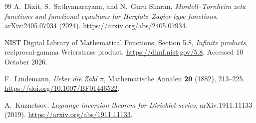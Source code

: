 \begin{thebibliography}{99}
A.~Dixit, S.~Sathyanarayana, and N.~Guru Sharan,
\emph{Mordell--Tornheim zeta functions and functional equations for
Herglotz--Zagier type functions}, arXiv:2405.07934 (2024).
\url{https://arxiv.org/abs/2405.07934}.

NIST Digital Library of Mathematical Functions, Section 5.8,
\emph{Infinite products}, reciprocal-gamma Weierstrass product.
\url{https://dlmf.nist.gov/5.8}. Accessed 10 October 2026.

F.~Lindemann, \emph{Ueber die Zahl $\pi$},
Mathematische Annalen \textbf{20} (1882), 213--225.
\url{https://doi.org/10.1007/BF01446522}.

A.~Kuznetsov, \emph{Lagrange inversion theorem for Dirichlet series},
arXiv:1911.11133 (2019).
\url{https://arxiv.org/abs/1911.11133}.

\end{thebibliography}
